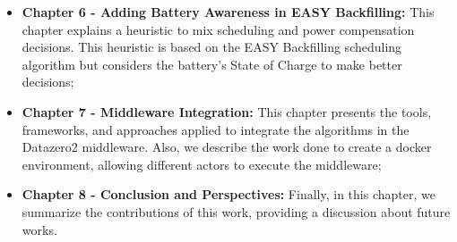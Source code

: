 \begin{itemize}
    \item[] \textbf{Chapter 6 - Adding Battery Awareness in EASY Backfilling:} This chapter explains a heuristic to mix scheduling and power compensation decisions. This heuristic is based on the EASY Backfilling scheduling algorithm but considers the battery's State of Charge to make better decisions;
    \item[] \textbf{Chapter 7 - Middleware Integration:} This chapter presents the tools, frameworks, and approaches applied to integrate the algorithms in the Datazero2 middleware. Also, we describe the work done to create a docker environment, allowing different actors to execute the middleware;
    \item[] \textbf{Chapter 8 - Conclusion and Perspectives:} Finally, in this chapter, we summarize the contributions of this work, providing a discussion about future works.
\end{itemize}
